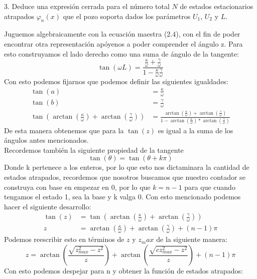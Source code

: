 
\begin{pregunta}{3.}
Deduce una expresión cerrada para el número total $N$ de estados estacionarios atrapados $\varphi_n(x)$ que el pozo soporta dados los parámetros $U_1$, $U_2$ y $L$.
\end{pregunta}
Juguemos algebraicamente con la ecuación maestra (2.4), con el fin de poder encontrar otra representación apóyenos a poder comprender el ángulo z. Para esto construyamos el lado derecho como una suma de ángulo de la tangente:
\begin{equation}
    \tan(\omega L) = \frac{\frac{\kappa}{\omega}+\frac{\gamma}{\omega}}{1 - \frac{\kappa}{\omega}\frac{\gamma}{\omega}}
\end{equation}
Con esto podemos fijarnos que podemos definir las siguientes igualdades:
\begin{align*}
    \tan(a) &= \frac{\kappa}{\omega}\\
    \tan(b) &= \frac{\gamma}{\omega}\\
    \tan(\arctan(\frac{\kappa}{\omega})+\arctan(\frac{\gamma}{\omega})) &= \frac{\arctan(\frac{\kappa}{\omega})+\arctan(\frac{\gamma}{\omega})}{1-\arctan(\frac{\kappa}{\omega})*\arctan(\frac{\gamma}{\omega})} 
\end{align*}
De esta manera obtenemos que para la $\tan(z)$  es igual a la suma de los ángulos antes mencionados.\\
Recordemos también la siguiente propiedad de la tangente
\begin{equation*}
    \tan(\theta) = \tan(\theta + k\pi) 
\end{equation*}
Donde k pertenece a los enteros, por lo que esto nos dictaminara la cantidad de estados atrapados, recordemos que nosotros buscamos que nuestro contador se construya con base en empezar en 0, por lo que $k = n-1 $ para que cuando tengamos el estado 1, sea la base y k valga 0. Con esto mencionado podemos hacer el siguiente desarrollo:
\begin{align}
    \tan(z) &= \tan(\arctan(\frac{\kappa}{\omega})+\arctan(\frac{\gamma}{\omega})) \\
    z &=  \arctan(\frac{\kappa}{\omega})+\arctan(\frac{\gamma}{\omega}) + (n-1)\pi
\end{align}
Podemos reescribir esto en términos de $z$ y $z_max$ de la siguiente manera:
\begin{equation}
    z = \arctan(\frac{\sqrt{z^2_{max}-z^2}}{z})+ \arctan(\frac{\sqrt{cz^2_{max}-z^2}}{z}) + (n-1)\pi
\end{equation}
Con esto podemos despejar para n y obtener la función de estados atrapados:
